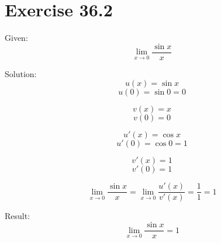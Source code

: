 \documentclass[a4paper, 10pt]{scrartcl}
\begin{document}
\section{Exercise 36.2}

Given:
\[\lim_{x\to 0}{\frac{\sin{x}}{x}}\]

Solution:
\[u(x) = \sin{x}\]
\[u(0) = \sin{0} = 0\]

\[v(x) = x\]
\[v(0) = 0\]

\[u'(x) = \cos{x}\]
\[u'(0) = \cos{0} = 1\]

\[v'(x) = 1\]
\[v'(0) = 1\]

\[\lim_{x\to 0}{\frac{\sin{x}}{x}} = \lim_{x\to 0}{\frac{u'(x)}{v'(x)}} = \frac{1}{1} = 1\]

Result:
\[\lim_{x\to 0}{\frac{\sin{x}}{x}} = 1\]
\end{document}
